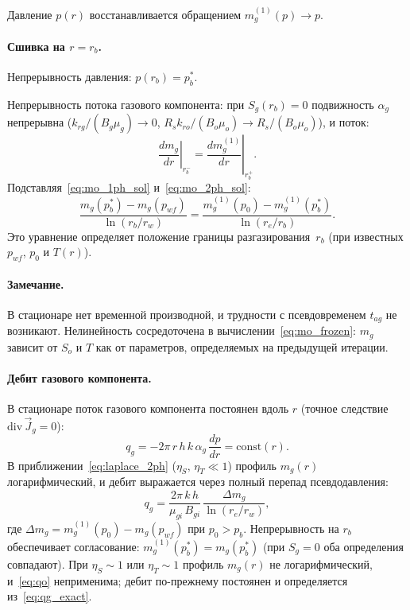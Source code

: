 ﻿\documentclass[12pt,a4paper]{article}
\begin{document}
Давление $p(r)$ восстанавливается обращением
$m_g^{(1)}(p) \to p$.

\paragraph{Сшивка на $r = r_b$.}
Непрерывность давления: $p(r_b) = p_b^*$.

Непрерывность потока газового компонента: при $S_g(r_b) = 0$
подвижность $\alpha_g$ непрерывна
($k_{rg}/(B_g\mu_g) \to 0$, $R_s k_{ro}/(B_o\mu_o) \to R_s/(B_o\mu_o)$),
и поток:
\begin{equation}\label{eq:flux_match}
  \left.\frac{dm_g}{dr}\right|_{r_b^-}
  = \left.\frac{dm_g^{(1)}}{dr}\right|_{r_b^+}.
\end{equation}
Подставляя~\eqref{eq:mo_1ph_sol} и~\eqref{eq:mo_2ph_sol}:
\begin{equation}\label{eq:flux_match_expl}
  \frac{m_g(p_b^*) - m_g(p_{wf})}{\ln(r_b/r_w)}
  = \frac{m_g^{(1)}(p_0) - m_g^{(1)}(p_b^*)}{\ln(r_e/r_b)}.
\end{equation}
Это уравнение определяет положение границы
разгазирования~$r_b$ (при известных $p_{wf}$, $p_0$
и $T(r)$).

\paragraph{Замечание.}
В стационаре нет временной производной, и трудности
с псевдовременем $t_{ag}$ не возникают. Нелинейность
сосредоточена в вычислении~\eqref{eq:mo_frozen}:
$m_g$ зависит от $S_o$ и $T$ как от параметров,
определяемых на предыдущей итерации.

\paragraph{Дебит газового компонента.}
В стационаре поток газового компонента постоянен
вдоль $r$ (точное следствие $\mathrm{div}\,\vec{J}_g = 0$):
\begin{equation}\label{eq:qg_exact}
  q_g = -2\pi\,r\,h\,k\,\alpha_g\,\frac{dp}{dr}
  = \mathrm{const}(r).
\end{equation}
В приближении~\eqref{eq:laplace_2ph}
($\eta_S,\,\eta_T \ll 1$) профиль $m_g(r)$
логарифмический, и дебит выражается через
полный перепад псевдодавления:
\begin{equation}\label{eq:qo}
  q_g = \frac{2\pi\,k\,h}{\mu_{gi}\,B_{gi}}\,
  \frac{\Delta m_g}{\ln(r_e/r_w)},
\end{equation}
где $\Delta m_g = m_g^{(1)}(p_0) - m_g(p_{wf})$
при $p_0 > p_b$. Непрерывность на $r_b$
обеспечивает согласование:
$m_g^{(1)}(p_b^*) = m_g(p_b^*)$
(при $S_g = 0$ оба определения совпадают).
При $\eta_S \sim 1$ или $\eta_T \sim 1$
профиль $m_g(r)$ не логарифмический,
и~\eqref{eq:qo} неприменима; дебит
по-прежнему постоянен и определяется
из~\eqref{eq:qg_exact}.
\end{document}
